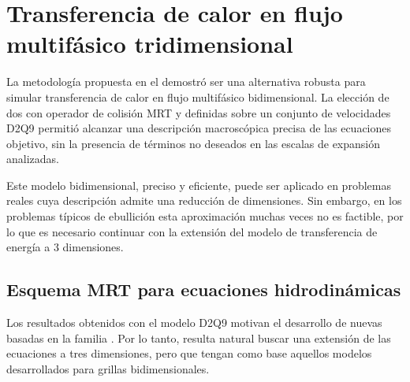 \chapter{Transferencia de calor en flujo multif\'asico tridimensional}
\label{chap:modelo3D}

La metodolog\'ia propuesta en el  demostr\'o ser una alternativa robusta para simular transferencia de calor en flujo multif\'asico bidimensional. La elecci\'on de dos \red{\lbe{}} con operador de colisi\'on MRT y definidas sobre un conjunto de velocidades D2Q9 permiti\'o alcanzar una descripci\'on macrosc\'opica precisa de las ecuaciones objetivo, sin la presencia de t\'erminos no deseados en las escalas de expansi\'on analizadas. 

Este modelo bidimensional, preciso y eficiente, puede ser aplicado en problemas reales cuya descripci\'on admite una reducci\'on de dimensiones. Sin embargo, en los problemas t\'ipicos de ebullici\'on esta aproximaci\'on muchas veces no es factible, por lo que es necesario continuar con la extensi\'on del modelo de transferencia de energ\'ia a 3 dimensiones.


\section{Esquema MRT para ecuaciones hidrodin\'amicas}

Los resultados obtenidos con el modelo D2Q9 motivan el desarrollo de nuevas \lbe{} basadas en la familia \pp{}. Por lo tanto, resulta natural buscar una extensi\'on de las ecuaciones a tres dimensiones, pero que tengan como base aquellos modelos desarrollados para grillas bidimensionales.

